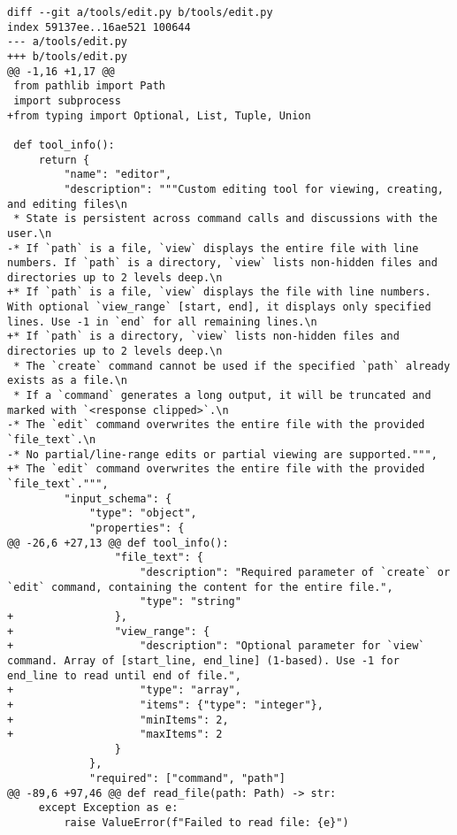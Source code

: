 \begin{lstlisting}[style=diffstyle]
diff --git a/tools/edit.py b/tools/edit.py
index 59137ee..16ae521 100644
--- a/tools/edit.py
+++ b/tools/edit.py
@@ -1,16 +1,17 @@
 from pathlib import Path
 import subprocess
+from typing import Optional, List, Tuple, Union
 
 def tool_info():
     return {
         "name": "editor",
         "description": """Custom editing tool for viewing, creating, and editing files\n
 * State is persistent across command calls and discussions with the user.\n
-* If `path` is a file, `view` displays the entire file with line numbers. If `path` is a directory, `view` lists non-hidden files and directories up to 2 levels deep.\n
+* If `path` is a file, `view` displays the file with line numbers. With optional `view_range` [start, end], it displays only specified lines. Use -1 in `end` for all remaining lines.\n
+* If `path` is a directory, `view` lists non-hidden files and directories up to 2 levels deep.\n
 * The `create` command cannot be used if the specified `path` already exists as a file.\n
 * If a `command` generates a long output, it will be truncated and marked with `<response clipped>`.\n
-* The `edit` command overwrites the entire file with the provided `file_text`.\n
-* No partial/line-range edits or partial viewing are supported.""",
+* The `edit` command overwrites the entire file with the provided `file_text`.""",
         "input_schema": {
             "type": "object",
             "properties": {
@@ -26,6 +27,13 @@ def tool_info():
                 "file_text": {
                     "description": "Required parameter of `create` or `edit` command, containing the content for the entire file.",
                     "type": "string"
+                },
+                "view_range": {
+                    "description": "Optional parameter for `view` command. Array of [start_line, end_line] (1-based). Use -1 for end_line to read until end of file.",
+                    "type": "array",
+                    "items": {"type": "integer"},
+                    "minItems": 2,
+                    "maxItems": 2
                 }
             },
             "required": ["command", "path"]
@@ -89,6 +97,46 @@ def read_file(path: Path) -> str:
     except Exception as e:
         raise ValueError(f"Failed to read file: {e}")
 

\end{lstlisting}
